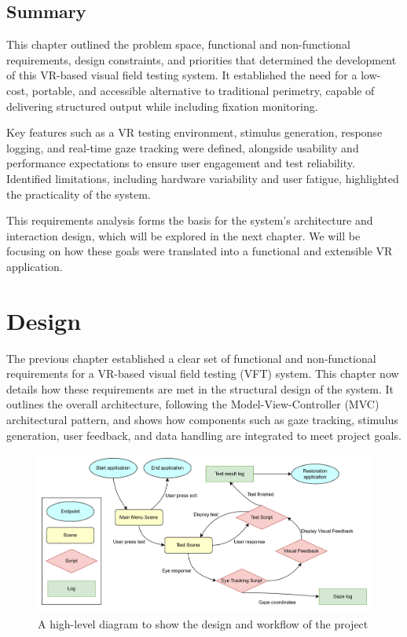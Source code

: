 \documentclass{l4proj}
\begin{document}
\section{Summary}

This chapter outlined the problem space, functional and non-functional requirements, design constraints, and priorities that determined the development of this VR-based visual field testing system. It established the need for a low-cost, portable, and accessible alternative to traditional perimetry, capable of delivering structured output while including fixation monitoring.

Key features such as a VR testing environment, stimulus generation, response logging, and real-time gaze tracking were defined, alongside usability and performance expectations to ensure user engagement and test reliability. Identified limitations, including hardware variability and user fatigue, highlighted the practicality of the system.

This requirements analysis forms the basis for the system’s architecture and interaction design, which will be explored in the next chapter. We will be focusing on how these goals were translated into a functional and extensible VR application.



\chapter{Design}

The previous chapter established a clear set of functional and non-functional requirements for a VR-based visual field testing (VFT) system. This chapter now details how these requirements are met in the structural design of the system. It outlines the overall architecture, following the Model-View-Controller (MVC) architectural pattern, and shows how components such as gaze tracking, stimulus generation, user feedback, and data handling are integrated to meet project goals.

\begin{figure}[!h]
    \centering
    \includegraphics[width=1.0\linewidth]{images/High Level Diagram.png}
    \caption{A high-level diagram to show the design and workflow of the project}
    \label{fig: project workflow}
\end{figure}
\end{document}
